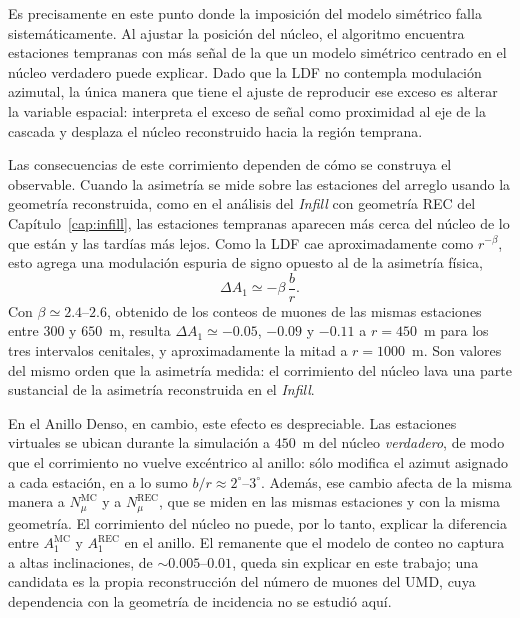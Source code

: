 Es precisamente en este punto donde la imposición del modelo simétrico falla sistemáticamente. Al ajustar la posición del núcleo, el algoritmo encuentra estaciones tempranas con más señal de la que un modelo simétrico centrado en el núcleo verdadero puede explicar. Dado que la LDF no contempla modulación azimutal, la única manera que tiene el ajuste de reproducir ese exceso es alterar la variable espacial: interpreta el exceso de señal como proximidad al eje de la cascada y desplaza el núcleo reconstruido hacia la región temprana.

Las consecuencias de este corrimiento dependen de cómo se construya el observable. Cuando la asimetría se mide sobre las estaciones del arreglo usando la geometría reconstruida, como en el análisis del \textit{Infill} con geometría REC del Capítulo~\ref{cap:infill}, las estaciones tempranas aparecen más cerca del núcleo de lo que están y las tardías más lejos. Como la LDF cae aproximadamente como $r^{-\beta}$, esto agrega una modulación espuria de signo opuesto al de la asimetría física,
\begin{equation}
	\Delta A_1 \simeq -\beta\,\frac{b}{r}.
	\label{eq:lavado_nucleo}
\end{equation}
Con $\beta \simeq 2.4$--$2.6$, obtenido de los conteos de muones de las mismas estaciones entre $300$ y $650$~m, resulta $\Delta A_1 \simeq -0.05$, $-0.09$ y $-0.11$ a $r=450$~m para los tres intervalos cenitales, y aproximadamente la mitad a $r=1000$~m. Son valores del mismo orden que la asimetría medida: el corrimiento del núcleo lava una parte sustancial de la asimetría reconstruida en el \textit{Infill}.

En el Anillo Denso, en cambio, este efecto es despreciable. Las estaciones virtuales se ubican durante la simulación a $450$~m del núcleo \textit{verdadero}, de modo que el corrimiento no vuelve excéntrico al anillo: sólo modifica el azimut asignado a cada estación, en a lo sumo $b/r \approx 2^\circ$--$3^\circ$. Además, ese cambio afecta de la misma manera a $N_\mu^{\mathrm{MC}}$ y a $N_\mu^{\mathrm{REC}}$, que se miden en las mismas estaciones y con la misma geometría. El corrimiento del núcleo no puede, por lo tanto, explicar la diferencia entre $A_1^{\mathrm{MC}}$ y $A_1^{\mathrm{REC}}$ en el anillo. El remanente que el modelo de conteo no captura a altas inclinaciones, de $\sim\!0.005$--$0.01$, queda sin explicar en este trabajo; una candidata es la propia reconstrucción del número de muones del UMD, cuya dependencia con la geometría de incidencia no se estudió aquí.

